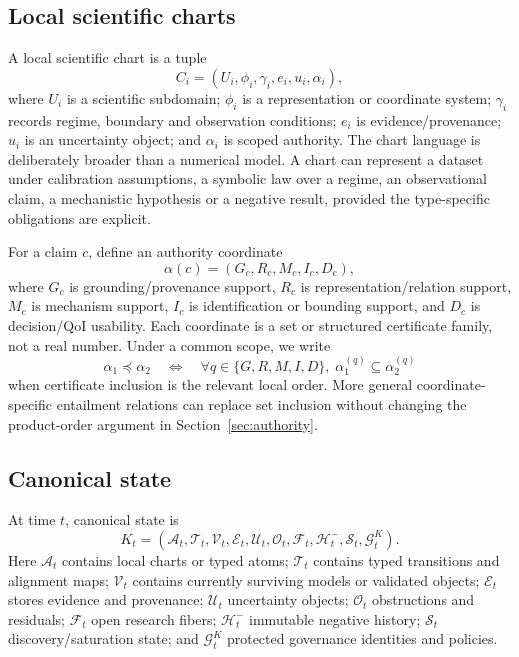 \subsection{Local scientific charts}

A local scientific chart is a tuple
\[
C_i=(U_i,\phi_i,\gamma_i,e_i,u_i,\alpha_i),
\]
where \(U_i\) is a scientific subdomain; \(\phi_i\) is a representation or coordinate system; \(\gamma_i\) records regime, boundary and observation conditions; \(e_i\) is evidence/provenance; \(u_i\) is an uncertainty object; and \(\alpha_i\) is scoped authority. The chart language is deliberately broader than a numerical model. A chart can represent a dataset under calibration assumptions, a symbolic law over a regime, an observational claim, a mechanistic hypothesis or a negative result, provided the type-specific obligations are explicit.

For a claim \(c\), define an authority coordinate
\[
\alpha(c)=(G_c,R_c,M_c,I_c,D_c),
\]
where \(G_c\) is grounding/provenance support, \(R_c\) is representation/relation support, \(M_c\) is mechanism support, \(I_c\) is identification or bounding support, and \(D_c\) is decision/QoI usability. Each coordinate is a set or structured certificate family, not a real number. Under a common scope, we write
\[
\alpha_1\preceq\alpha_2
\quad\Longleftrightarrow\quad
\forall q\in\{G,R,M,I,D\},\; \alpha_1^{(q)}\subseteq \alpha_2^{(q)}
\]
when certificate inclusion is the relevant local order. More general coordinate-specific entailment relations can replace set inclusion without changing the product-order argument in Section~\ref{sec:authority}.

\subsection{Canonical state}

At time \(t\), canonical state is
\[
K_t=(\mathcal A_t,\mathcal T_t,\mathcal V_t,\mathcal E_t,\mathcal U_t,
\mathcal O_t,\mathcal F_t,\mathcal H_t^{-},\mathcal S_t,\mathcal G_t^K).
\]
Here \(\mathcal A_t\) contains local charts or typed atoms; \(\mathcal T_t\) contains typed transitions and alignment maps; \(\mathcal V_t\) contains currently surviving models or validated objects; \(\mathcal E_t\) stores evidence and provenance; \(\mathcal U_t\) uncertainty objects; \(\mathcal O_t\) obstructions and residuals; \(\mathcal F_t\) open research fibers; \(\mathcal H_t^{-}\) immutable negative history; \(\mathcal S_t\) discovery/saturation state; and \(\mathcal G_t^K\) protected governance identities and policies.

